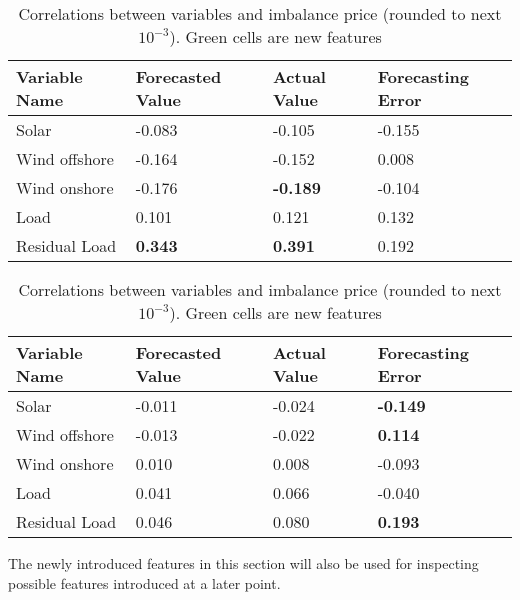 \documentclass[class=scrbook, crop=false]{standalone}
\begin{document}
    \begin{table}
    \centering
    \begin{tabular}{l|l|l|l}
    Variable Name	&Forecasted Value& Actual Value	& Forecasting Error \\\hline
    Solar 		& -0.083		& -0.105		& \cellcolor{green} -0.155 \\
    Wind offshore 	& -0.164		& -0.152		& \cellcolor{green} 0.008 \\
    Wind onshore 	& -0.176		& \textbf{-0.189}	& \cellcolor{green} -0.104 \\
    Load 		&0.101		& 0.121		& \cellcolor{green}  0.132 \\
    Residual Load 	& \cellcolor{green} \textbf{0.343}& \cellcolor{green} \textbf{0.391}& \cellcolor{green}0.192\\
    \end{tabular}

    
    \caption{Correlations between variables and imbalance price (rounded to next $10^{-3}$). Green cells are new features}
    \label{Table::Rebap_Correlations_ENTSOE}
    \end{table}

    \begin{table}
    \centering
    \begin{tabular}{l|l|l|l}
    Variable Name	&Forecasted Value& Actual Value	& Forecasting Error \\\hline
    Solar 		&  -0.011		& -0.024		& \cellcolor{green} \textbf{-0.149} \\
    Wind offshore 	& -0.013		&  -0.022		& \cellcolor{green}\textbf{0.114}\\
    Wind onshore 	& 0.010		& 0.008		& \cellcolor{green} -0.093\\
    Load 		& 0.041		& 0.066		& \cellcolor{green}  -0.040 \\
    Residual Load 	& \cellcolor{green} 0.046& \cellcolor{green} 0.080& \cellcolor{green} \textbf{0.193}\\
    \end{tabular}

    
    \caption{Correlations between variables and imbalance price (rounded to next $10^{-3}$). Green cells are new features}
    \label{Table::Imbalance_volume_Correlations_ENTSOE}
    \end{table}
    
    The newly introduced features in this section will also be used for inspecting possible features introduced at a later point.
    
\end{document}
